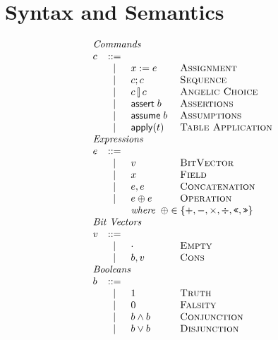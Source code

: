 \section{Syntax and Semantics}


\begin{figure}[ht]
  \[\begin{array}{l c l l}
      \multicolumn{4}{l}{\textit{Commands}}\\
      c & ::=& \\
        & \mid & x := e & \textsc{Assignment}\\
        & \mid & c;c & \textsc{Sequence} \\
        & \mid & c \angel c & \textsc{Angelic Choice}\\
        & \mid & \assert b & \textsc{Assertions} \\
        & \mid & \assume b & \textsc{Assumptions} \\
        & \mid & \apply t & \textsc{Table Application}\\
      \multicolumn{4}{l}{\textit{Expressions}} \\
      e & ::= & \\
        & \mid & v            & \textsc{BitVector} \\
        & \mid & x            & \textsc{Field} \\
        & \mid & e,e          & \textsc{Concatenation} \\
        & \mid & e \oplus e   & \textsc{Operation} \\
        & &  \multicolumn{2}{l}{\textit{where}\;\; \oplus \in \{+,-,\times, \div, \texttt{<<}, \texttt{>>} \}} \\
      \multicolumn{4}{l}{\textit{Bit Vectors}}\\
      v & ::= & \\
        & \mid & \cdot & \textsc{Empty} \\
        & \mid & b,v   & \textsc{Cons} \\
      \multicolumn{4}{l}{\textit{Booleans}}\\
      b & ::= & \\
        & \mid & \TRUE & \textsc{Truth} \\
        & \mid & \FALSE & \textsc{Falsity} \\
        & \mid & b \wedge b & \textsc{Conjunction} \\
        & \mid & b \vee b & \textsc{Disjunction} \\


\end{array}\]
\end{figure}
